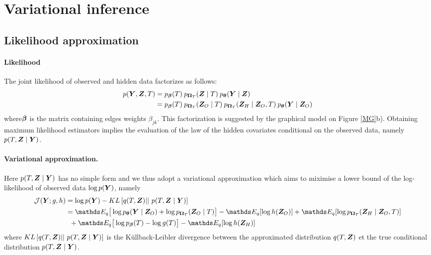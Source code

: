 \section{Variational inference}

\subsection{Likelihood approximation}
 \paragraph{Likelihood}
 The joint likelihood of observed and hidden data factorizes as follows:
\begin{align*}
p(\boldsymbol{Y},\boldsymbol{Z},T)& = p_{\boldsymbol{\beta}}(T) \: p_{\boldsymbol{\Omega}_T}(\boldsymbol{Z} \mid T) \: p_ {\boldsymbol{\theta}}(\boldsymbol{Y} \mid \boldsymbol{Z}) \\
&= p_{\boldsymbol{\beta}}(T) \: p_{\boldsymbol{\Omega}_T}(\boldsymbol{Z}_O \mid T) \: p_{\boldsymbol{\Omega}_T}(\boldsymbol{Z}_H  \mid  \boldsymbol{Z}_O,T)  \: p_{\boldsymbol{\theta}}(\boldsymbol{Y} \mid \boldsymbol{Z}_O)
\end{align*} 
where$\boldsymbol{\beta}$ is the matrix containing edges weights $\beta_{jk}$. This factorization is suggested by the graphical model on Figure \ref{MG}b).  Obtaining maximum likelihood estimators implies the evaluation of the law of the hidden covariates conditional on the observed data, namely $p(T, \boldsymbol{Z} \mid \boldsymbol{Y})$. 

\paragraph{Variational approximation.}
 Here $p(T, \boldsymbol{Z} \mid \boldsymbol{Y})$ has no simple form and we thus adopt a variational approximation which aims to miximise a lower bound of the log-likelihood of observed data $\log p(\boldsymbol{Y})$, namely
\begin{align*}
    \mathcal{J}(\Ybf; g,h)
    & = \log p(\Ybf) - KL\left[q(T,\Zbf) \middle\vert\middle\vert\ p(T,\Zbf \mid \Ybf)\right]\\
    & =\Esp_{q}\big[\log p_{\thetabf}(\Ybf\mid \Zbf_O)+ \log p_{\Omegabf_T}(\Zbf_O \mid T)\big]-\Esp_q[\log h(\Zbf_O)]  +\Esp_{q}[\log p_{\Omegabf_T}(\Zbf_H \mid \Zbf_O,T)] \\
    & \;\; +\Esp_q\big[\log p_{\betabf}(T) - \log g(T)\big]  -\Esp_q[\log h(\Zbf_H)]
\end{align*}
 where $KL\left[q(T,\boldsymbol{Z}) \middle\vert\middle\vert\ p(T,\boldsymbol{Z} \mid \boldsymbol{Y})\right]$ is the Küllback-Leibler  divergence between the approximated distribution  $q(T,\boldsymbol{Z})$  et the true conditional distribution $p(T, \boldsymbol{Z} \mid \boldsymbol{Y})$.

